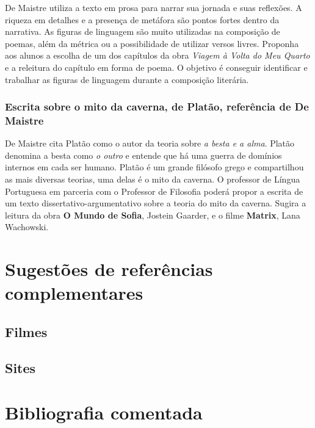 \documentclass[12pt]{extarticle}
\begin{document}
De Maistre utiliza a texto em prosa para narrar sua jornada e suas
reflexões. A riqueza em detalhes e a presença de metáfora são pontos
fortes dentro da narrativa. As figuras de linguagem são muito
utilizadas na composição de poemas, além da métrica ou a possibilidade
de utilizar versos livres. Proponha aos alunos a escolha de um dos
capítulos da obra \emph{Viagem à Volta do Meu Quarto} e a releitura do
capítulo em forma de poema. O objetivo é conseguir identificar e
trabalhar as figuras de linguagem durante a composição literária.

\subsubsection{Escrita sobre o mito da caverna, de Platão, referência de De Maistre}

De Maistre cita Platão como o autor da teoria sobre \emph{a besta e a
alma}. Platão denomina a besta como \emph{o outro} e entende que há
uma guerra de domínios internos em cada ser humano. Platão é um grande
filósofo grego 
e compartilhou as mais diversas teorias, uma delas é o mito da caverna.
O professor de Língua Portuguesa em parceria com o Professor de
Filosofia poderá propor a escrita de um texto dissertativo-argumentativo
sobre a teoria do mito da caverna. Sugira a leitura da obra \textbf{O
Mundo de Sofia}, Jostein Gaarder, e o filme \textbf{Matrix}, Lana
Wachowski.

\section{Sugestões de referências complementares}\label{sugestoes}

\subsection{Filmes}

\subsection{Sites}


\section{Bibliografia comentada}
\end{document}
